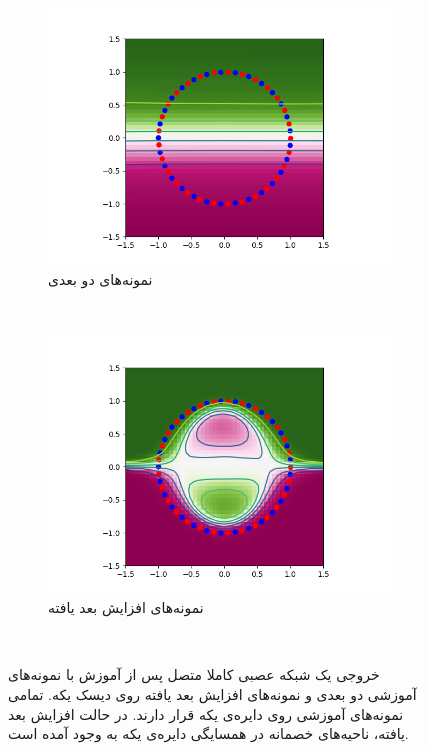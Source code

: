 \documentclass[12pt,onecolumn,a4paper]{article}
\begin{document}
\begin{figure}
	\centering
	\begin{subfigure}[b]{0.45\textwidth}
		\includegraphics[width=\textwidth]{2d_plain.png}
		\caption{نمونه‌های دو بعدی}
		\label{fig:2dplain}
	\end{subfigure}
	~ %
	\begin{subfigure}[b]{0.45\textwidth}
		\includegraphics[width=\textwidth]{2d_aug.png}
		\caption{نمونه‌های افزایش بعد یافته}
		\label{fig:2daug}
	\end{subfigure}
	~ %
	\caption{
		خروجی یک شبکه عصبی کاملا متصل پس از آموزش با نمونه‌های آموزشی دو بعدی و نمونه‌های افزایش بعد یافته روی دیسک یکه. تمامی نمونه‌های آموزشی روی دایره‌ی یکه قرار دارند. در حالت افزایش بعد یافته، ناحیه‌های خصمانه در همسایگی دایره‌ی یکه به وجود آمده است.
	}
	\label{fig:2d}
\end{figure}
\end{document}
